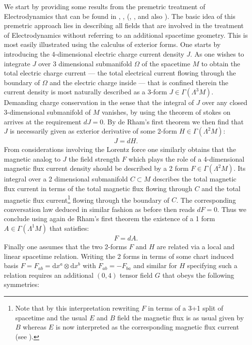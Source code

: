 We start by providing some results from the premetric treatment of Electrodynamics that can be found in \cite{1999PhLB..458..466O}, \cite{1999gr.qc....11096H}, (\cite{hehl2003foundations}, \cite{2006physics..10221H}, \cite{2004PhRvD..70j5022L} and also \cite{Hehl2005}). The basic idea of this premetric approach lies in describing all fields that are involved in the treatment of Electrodynamics without referring to an additional spacetime geometry. This is most easily illustrated using the calculus of exterior forms. One starts by introducing the 4-dimensional electric charge current density $J$. As one wishes to integrate $J$ over 3 dimensional submanifold $\Omega$ of the spacetime $M$ to obtain the total electric charge current --- the total electrical current flowing through the boundary of $\Omega$ and the electric charge inside --- that is confined therein the current density is most naturally described as a 3-form $J \in \Gamma(\Lambda^3M)$. Demanding charge conservation in the sense that the integral of $J$ over any closed 3-dimensional submanifold of $M$ vanishes, by using the theorem of stokes on arrives at the requirement $dJ =0$. By de Rham's first theorem we then find that $J$ is necessarily given as exterior derivative of some 2-form $H \in \Gamma(\Lambda^2M)$:
\begin{align}
    J = d H.
\end{align}
From considerations involving the Lorentz force one similarly obtains that the magnetic analog to $J$ the field strength $F$ which plays the role of a 4-dimensional magnetic flux current density should be described by a 2 form $F \in \Gamma(\Lambda^2M)$. Its integral over a 2 dimensional submanifold $C \subset M$ describes the total magnetic flux current in terms of the total magnetic flux flowing through $C$ and the total magnetic flux current\footnote{Note that by this interpretation rewriting $F$ in terms of a 3+1 split of spacetime and the usual $E$ and $B$ field the magnetic flux is as usual given by $B$ whereas $E$ is now interpreted as the corresponding magnetic flux current (see \cite{2006physics..10221H}).} flowing through the boundary of $C$. The corresponding conversation law deduced in similar fashion as before then reads $dF =0$. Thus we conclude using again de Rham's first theorem the existence of a 1 form $A \in \Gamma(\Lambda^1M)$ that satisfies:
\begin{align}
    F = d A.
\end{align}
Finally one assumes that the two 2-forms $F$ and $H$ are related via a local and linear spacetime relation. Writing the 2 forms in terms of some chart induced basis $F = F_{ab} = \mathrm{d}x^a \otimes \mathrm{d}x^b$ with $F_{ab} = - F_{ba}$ and similar for $H$ specifying such a relation requires an additional $(0,4)$ tensor field $G$ that obeys the following symmetries:
